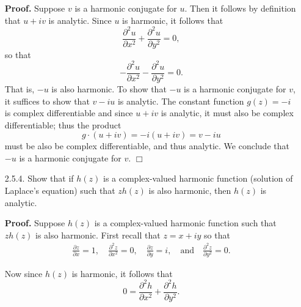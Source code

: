 \documentclass[9pt]{article}
\newcommand{\qed}{\hfill \ensuremath{\Box}}
\begin{document}
\begin{enumerate}
      \textbf{Proof.} Suppose $v$ is a harmonic conjugate for $u$. Then it
      follows by definition that $u + iv$ is analytic. Since $u$ is harmonic, it
      follows that
      $$\frac{\partial^2 u}{\partial x^2} + \frac{\partial^2 u}{\partial y^2}
        = 0,$$
      so that
      $$-\frac{\partial^2 u}{\partial x^2} - \frac{\partial^2 u}{\partial y^2}
        = 0.$$
      That is, $-u$ is also harmonic. To show that $-u$ is a harmonic conjugate
      for $v$, it suffices to show that $v - iu$ is analytic. The constant
      function $g(z) = -i$ is complex differentiable and since $u + iv$ is
      analytic, it must also be complex differentiable; thus the product
      $$g \cdot (u + iv) = -i(u + iv) = v - iu$$
      must be also be complex differentiable, and thus analytic. We conclude
      that $-u$ is a harmonic conjugate for $v$. \qed
   \item[2.5.4.]  Show that if $h(z)$ is a complex-valued harmonic function 
                  (solution of Laplace's equation) such that $zh(z)$ is also
                  harmonic, then $h(z)$ is analytic.
                  
      \textbf{Proof.} Suppose $h(z)$ is a complex-valued harmonic function such
      that $zh(z)$ is also harmonic. First recall that $z = x + iy$ so that
      \begin{align*}
         \frac{\partial z}{\partial x} = 1, \quad
         \frac{\partial^2 z}{\partial x^2} = 0, \quad
         \frac{\partial z}{\partial y} = i, \quad \text{and} \quad
         \frac{\partial^2 z}{\partial y^2} = 0.
      \end{align*}
      
      Now since $h(z)$ is harmonic, it follows that
      \begin{equation} \label{2_5_4_1}
         0 = \frac{\partial^2 h}{\partial x^2} +
             \frac{\partial^2 h}{\partial y^2}.
      \end{equation}
      

\end{enumerate}
\end{document}
